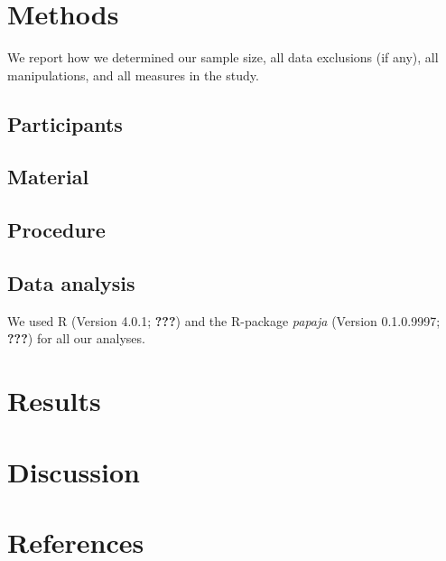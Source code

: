 \documentclass[
  english,
  man,mask,floatsintext]{apa6}
\begin{document}
\hypertarget{methods}{%
\section{Methods}\label{methods}}

We report how we determined our sample size, all data exclusions (if any), all manipulations, and all measures in the study.

\hypertarget{participants}{%
\subsection{Participants}\label{participants}}

\hypertarget{material}{%
\subsection{Material}\label{material}}

\hypertarget{procedure}{%
\subsection{Procedure}\label{procedure}}

\hypertarget{data-analysis}{%
\subsection{Data analysis}\label{data-analysis}}

We used R (Version 4.0.1; {\textbf{???}}) and the R-package \emph{papaja} (Version 0.1.0.9997; {\textbf{???}}) for all our analyses.

\hypertarget{results}{%
\section{Results}\label{results}}

\hypertarget{discussion}{%
\section{Discussion}\label{discussion}}

\newpage

\hypertarget{references}{%
\section{References}\label{references}}

\begingroup
\setlength{\parindent}{-0.5in}
\setlength{\leftskip}{0.5in}
\end{document}
